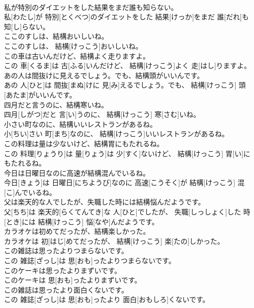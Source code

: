 \documentclass[8pt]{extreport}
\begin{document}
\begin{CJK}{UTF8}{min}
\\	私が特別のダイエットをした結果をまだ誰も知らない。	
\\	私[わたし]が 特別[とくべつ]のダイエットをした 結果[けっか]をまだ 誰[だれ]も 知[し]らない。
\\	ここのすしは、結構おいしいね。	
\\	ここのすしは、 結構[けっこう]おいしいね。
\\	この車は古いんだけど、結構よく走りますよ。	
\\	この 車[くるま]は 古[ふる]いんだけど、 結構[けっこう]よく 走[はし]りますよ。
\\	あの人は間抜けに見えるでしょう。でも、結構頭がいいんです。	
\\	あの 人[ひと]は 間抜[まぬ]けに 見[み]えるでしょう。でも、 結構[けっこう] 頭[あたま]がいいんです。
\\	四月だと言うのに、結構寒いね。	
\\	四月[しがつ]だと 言[い]うのに、 結構[けっこう] 寒[さむ]いね。
\\	小さい町なのに、結構いいレストランがあるね。	
\\	小[ちい]さい 町[まち]なのに、 結構[けっこう]いいレストランがあるね。
\\	この料理は量は少ないけど、結構胃にもたれるね。	
\\	この 料理[りょうり]は 量[りょう]は 少[すく]ないけど、 結構[けっこう] 胃[い]にもたれるね。
\\	今日は日曜日なのに高速が結構混んでいるね。	
\\	今日[きょう]は 日曜日[にちようび]なのに 高速[こうそく]が 結構[けっこう] 混[こ]んでいるね。
\\	父は楽天的な人でしたが、失職した時には結構悩んだようです。	
\\	父[ちち]は 楽天的[らくてんてき]な 人[ひと]でしたが、 失職[しっしょく]した 時[とき]には 結構[けっこう] 悩[なや]んだようです。
\\	カラオケは初めてだったが、結構楽しかった。	
\\	カラオケは 初[はじ]めてだったが、 結構[けっこう] 楽[たの]しかった。
\\	この雑誌は思ったよりつまらないです。	
\\	この 雑誌[ざっし]は 思[おも]ったよりつまらないです。
\\	このケーキは思ったよりまずいです。	
\\	このケーキは 思[おも]ったよりまずいです。
\\	この雑誌は思ったより面白くないです。	
\\	この 雑誌[ざっし]は 思[おも]ったより 面白[おもしろ]くないです。

\end{CJK}
\end{document}
